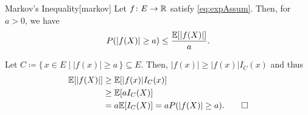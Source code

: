 \documentclass[../probability.tex]{subfiles}
\begin{document}
\begin{Theorem}{Markov's Inequality}[markov]
    Let \(f \colon E \to \RR\) satisfy \eqref{eq:expAssum}.
    Then, for \(a > 0\), we have
    \[
        P(|f(X)| \ge a) \le \frac{\mathbb{E}[|f(X)|]}{a}\text.
    \]
\end{Theorem}
\begin{myproof}[Proof]
    Let \(C \coloneqq \{\,x \in E \mid |f(x)| \ge a\,\} \subseteq E\).
    Then, \(|f(x)| \ge |f(x)| I_C(x)\) and thus
    \begin{align*}
        \mathbb{E}[|f(X)|]
        &\ge \mathbb{E}[|f(x)| I_C(x)] \\
        &\ge \mathbb{E}[aI_C(X)] \\
        &= a\mathbb{E}[I_C(X)] = aP(|f(X)| \ge a)\text. \qedhere
    \end{align*}
\end{myproof}
\end{document}
